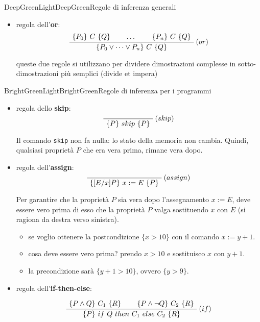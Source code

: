 \documentclass[a4paper,11pt]{report}
\begin{document}
\begin{cdefframe}{DeepGreenLight}{DeepGreen}{Regole di inferenza generali}
\begin{itemize}
\[
\AxiomC{$\{P\} \ C \ \{Q_0\}$}
\AxiomC{$\dots$}
\AxiomC{$\{P\} \ C \ \{Q_n\}$}
\RightLabel{$(and)$}
\TrinaryInfC{$\{P\} \ C \ \{Q_0 \wedge \dots \wedge Q_n\}$}
\DisplayProof
\]

    \item regola dell'\textbf{or}:
\[
\AxiomC{$\{P_0\} \ C \ \{Q\}$}
\AxiomC{$\dots$}
\AxiomC{$\{P_n\} \ C \ \{Q\}$}
\RightLabel{$(or)$}
\TrinaryInfC{$\{P_0 \vee \dots \vee P_n\} \ C \ \{Q\}$}
\DisplayProof
\]

queste due regole si utilizzano per dividere dimostrazioni complesse in sotto-dimostrazioni più semplici (divide et impera)

\end{itemize}
\end{cdefframe}


\begin{cdefframe}{BrightGreenLight}{BrightGreen}{Regole di inferenza per i programmi}
\begin{itemize}
    \item regola dello \textbf{skip}:
\[
\AxiomC{}
\RightLabel{$(skip)$}
\UnaryInfC{$\{P\} \ skip \ \{P\}$}
\DisplayProof
\]

Il comando \texttt{skip} non fa nulla: lo stato della memoria non cambia. Quindi, qualsiasi proprietà \( P \) che era vera prima, rimane vera dopo.

    \item regola dell'\textbf{assign}:
\[
\AxiomC{}
\RightLabel{$(assign)$}
\UnaryInfC{$\{[E/x]P\} \ x := E \ \{P\}$}
\DisplayProof
\]

Per garantire che la proprietà \( P \) sia vera dopo l'assegnamento \( x := E \), deve essere vero prima di esso che la proprietà \( P \) valga sostituendo \( x \) con \( E \) (si ragiona da destra verso sinistra).

\begin{itemize}
    \color{CadetBlue}
        \item se voglio ottenere la postcondizione \( \{ x > 10 \} \) con il comando \( x := y + 1 \).
        \item cosa deve essere vero prima? prendo \( x > 10 \) e sostituisco \( x \) con \( y+1 \).
        \item la precondizione sarà \( \{ y + 1 > 10 \} \), ovvero \( \{ y > 9 \} \).
    \end{itemize}

    \item regola dell'\textbf{if-then-else}:

\[
\AxiomC{$\{P \wedge Q\} \ C_1 \ \{R\}$}
\AxiomC{$\{P \wedge \neg Q\} \ C_2 \ \{R\}$}
\RightLabel{$(if)$}
\BinaryInfC{$\{P\} \ if \ Q \ then \ C_1 \ else \ C_2 \ \{R\}$}
\DisplayProof
\]


\end{itemize}
\end{cdefframe}
\end{document}
